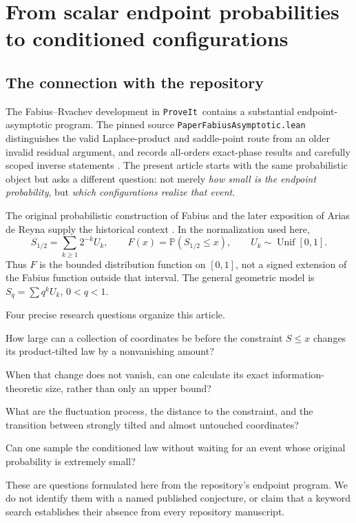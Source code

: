 \documentclass[11pt,a4paper]{article}
\numberwithin{equation}{section}
\theoremstyle{definition}
\theoremstyle{remark}
\newcommand{\Pp}{\mathbb P}
\newcommand{\repo}{\texttt{ProveIt}}
\begin{document}
\hypersetup{pageanchor=true}
\tableofcontents
\clearpage
{}

\section{From scalar endpoint probabilities to conditioned configurations}
\label{sec:introduction}

\subsection{The connection with the repository}
The Fabius--Rvachev development in \repo\ contains a substantial
endpoint-asymptotic program. The pinned source
\texttt{PaperFabiusAsymptotic.lean} distinguishes the valid
Laplace-product and saddle-point route from an older invalid residual
argument, and records all-orders exact-phase results and carefully
scoped inverse statements \cite{repo}. The present article starts with
the same probabilistic object but asks a different question: not merely
\emph{how small is the endpoint probability}, but \emph{which
configurations realize that event}.

The original probabilistic construction of Fabius and the later
exposition of Arias de Reyna supply the historical context
\cite{fabius,arias}. In the normalization used here,
\begin{equation}\label{eq:fabius-series}
 S_{1/2}=\sum_{k\ge1}2^{-k}U_k,\qquad
 F(x)=\Pp(S_{1/2}\le x),\qquad U_k\sim\operatorname{Unif}[0,1].
\end{equation}
Thus $F$ is the bounded distribution function on $[0,1]$, not a signed
extension of the Fabius function outside that interval. The general
geometric model is $S_q=\sum q^kU_k$, $0<q<1$.

Four precise research questions organize this article.
\begin{description}[leftmargin=3em,style=nextline]
\item[Q1: Independence threshold.]
How large can a collection of coordinates be before the constraint
$S\le x$ changes its product-tilted law by a nonvanishing amount?
\item[Q2: The price of a macroscopic block.]
When that change does not vanish, can one calculate its exact
information-theoretic size, rather than only an upper bound?
\item[Q3: Bulk and boundary geometry.]
What are the fluctuation process, the distance to the constraint, and
the transition between strongly tilted and almost untouched coordinates?
\item[Q4: Constructive realization.]
Can one sample the conditioned law without waiting for an event whose
original probability is extremely small?
\end{description}
These are questions formulated here from the repository's endpoint
program. We do not identify them with a named published conjecture, or
claim that a keyword search establishes their absence from every
repository manuscript.
\end{document}
